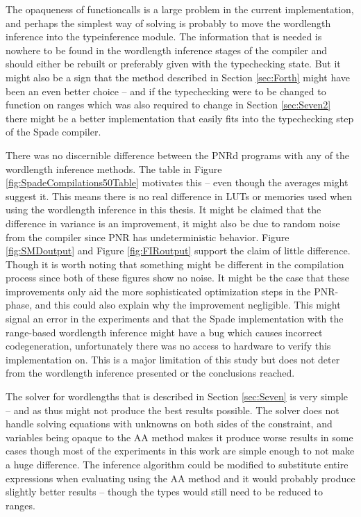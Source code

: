 The opaqueness of functioncalls is a large problem in the current implementation, and perhaps the simplest way of solving is probably to move the wordlength inference into the typeinference module. The information that is needed is nowhere to be found in the wordlength inference stages of the compiler and should either be rebuilt or preferably given with the typechecking state. But it might also be a sign that the method described in Section \ref{sec:Forth} might have been an even better choice -- and if the typechecking were to be changed to function on ranges which was also required to change in Section \ref{sec:Seven2} there might be a better implementation that easily fits into the typechecking step of the Spade compiler.

There was no discernible difference between the PNRd programs with any of the wordlength inference methods. The table in Figure \ref{fig:SpadeCompilations50Table} motivates this -- even though the averages might suggest it. This means there is no real difference in LUTs or memories used when using the wordlength inference in this thesis. It might be claimed that the difference in variance is an improvement, it might also be due to random noise from the compiler since PNR has undeterministic behavior. Figure \ref{fig:SMDoutput} and Figure \ref{fig:FIRoutput} support the claim of little difference. Though it is worth noting that something might be different in the compilation process since both of these figures show no noise. It might be the case that these improvements only aid the more sophisticated optimization steps in the PNR-phase, and this could also explain why the improvement negligible. This might signal an error in the experiments and that the Spade implementation with the range-based wordlength inference might have a bug which causes incorrect codegeneration, unfortunately there was no access to hardware to verify this implementation on. This is a major limitation of this study but does not deter from the wordlength inference presented or the conclusions reached.

The solver for wordlengths that is described in Section \ref{sec:Seven} is very simple -- and as thus might not produce the best results possible. The solver does not handle solving equations with unknowns on both sides of the constraint, and variables being opaque to the AA method makes it produce worse results in some cases though most of the experiments in this work are simple enough to not make a huge difference. The inference algorithm could be modified to substitute entire expressions when evaluating using the AA method and it would probably produce slightly better results -- though the types would still need to be reduced to ranges.

